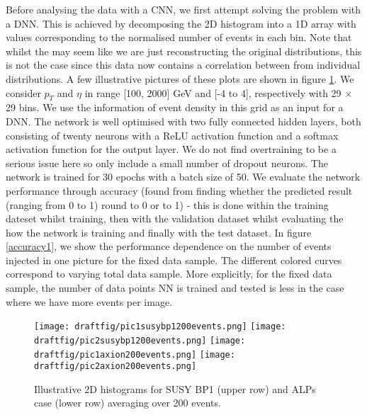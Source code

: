 \documentclass[aps,onecolumn,showpacs,superscriptaddress,groupedaddress,nofootinbib,preprint]{revtex4-1}
\begin{document}
Before analysing the data with a CNN, we first attempt solving the problem with a DNN. This is achieved by decomposing the 2D histogram into a 1D array with values corresponding to the normalised number of events in each bin. Note that whilst the may seem like we are just reconstructing the original distributions, this is not the case since this data now contains a correlation between from individual distributions. A few illustrative pictures of these plots are shown in figure \ref{demopic}. We consider $p_T$ and $\eta$ in range [100, 2000] GeV and [-4 to 4], respectively with 29 $\times$ 29 bins. We use the information of event density in this grid as an input for a DNN. The network is well optimised with two fully connected hidden layers, both consisting of twenty neurons with a ReLU activation function and a softmax activation function for the output layer. We do not find overtraining to be a serious issue here so only include a small number of dropout neurons. The network is trained for 30 epochs with a batch size of 50. We evaluate the network performance through accuracy (found from finding whether the predicted result (ranging from 0 to 1) round to 0 or to 1) - this is done within the training dateset whilst training, then with the validation dataset whilst evaluating the how the network is training and finally with the test dataset. In figure \ref{accuracy1}, we show the performance dependence on the number of events injected in one picture for the fixed data sample. 
The different colored curves correspond to varying total data sample. More explicitly, for the fixed data sample, the number of data points NN is trained and tested is 
less in the case where we have more events per image.
\begin{figure} [H]
\centering
\texttt{[image: draftfig/pic1susybp1200events.png]}
\texttt{[image: draftfig/pic2susybp1200events.png]}
\texttt{[image: draftfig/pic1axion200events.png]}
\texttt{[image: draftfig/pic2axion200events.png]}
\caption{Illustrative 2D histograms for SUSY BP1 (upper row) and ALPs case (lower row) averaging over 200 events.}\label{demopic}
\end{figure}
\end{document}
